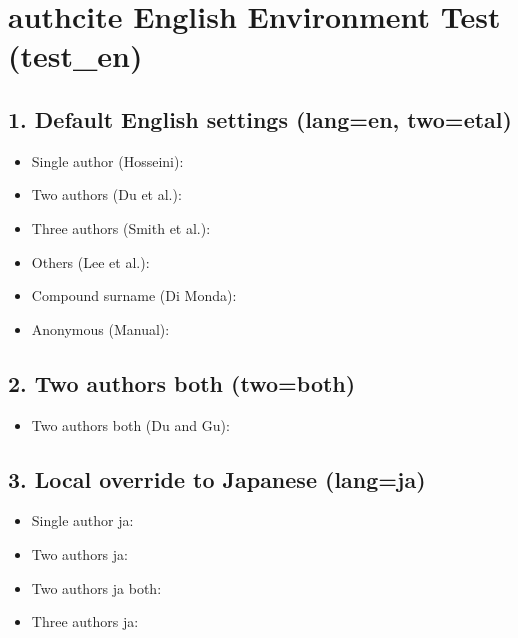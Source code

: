 \documentclass{article}
\begin{document}
\section*{authcite English Environment Test (test\_en)}

\subsection*{1. Default English settings (lang=en, two=etal)}
\begin{itemize}
  \item Single author (Hosseini): 
  \item Two authors (Du et al.): 
  \item Three authors (Smith et al.): 
  \item Others (Lee et al.): 
  \item Compound surname (Di Monda): 
  \item Anonymous (Manual): 
\end{itemize}

\subsection*{2. Two authors both (two=both)}
\begin{itemize}
  \item Two authors both (Du and Gu): 
\end{itemize}

\subsection*{3. Local override to Japanese (lang=ja)}
\begin{itemize}
  \item Single author ja: 
  \item Two authors ja: 
  \item Two authors ja both: 
  \item Three authors ja: 
\end{itemize}



\end{document}

